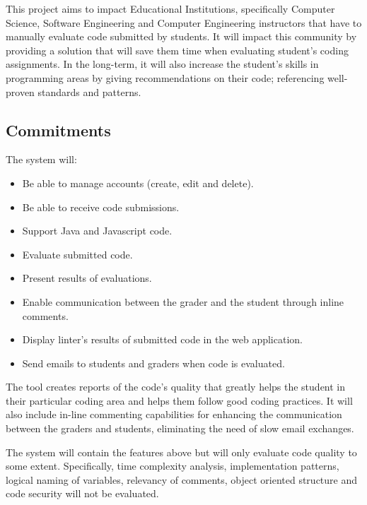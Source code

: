 
This project aims to impact Educational Institutions, specifically Computer
Science, Software Engineering and Computer Engineering instructors that have to
manually evaluate code submitted by students. It will impact this community by
providing a solution that will save them time when evaluating
student's coding assignments. In the long-term, it will also increase the
student's skills in programming areas by giving recommendations on their code;
referencing well-proven standards and patterns.

\subsection{Commitments}

The system will:
\begin{itemize}
\item Be able to manage accounts (create, edit and delete).
\item Be able to receive code submissions.
\item Support Java and Javascript code.
\item Evaluate submitted code.
\item Present results of evaluations.
\item Enable communication between the grader and the student through
inline comments.
\item Display linter's results of submitted code in the web application.
\item Send emails to students and graders when code is evaluated.
\end{itemize}

The tool creates reports of the code's quality that greatly helps the student
in their particular coding area and helps them follow good coding practices. It
will also include in-line commenting capabilities for enhancing the
communication between the graders and students, eliminating the need of slow
email exchanges.


The system will contain the features above but will only evaluate code quality
to some extent. Specifically, time complexity analysis, implementation patterns,
logical naming of variables, relevancy of comments, object oriented structure
and code security will not be evaluated.


